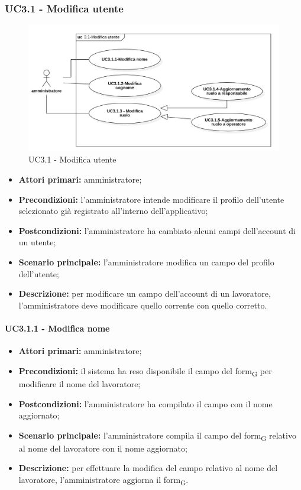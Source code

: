 \subsubsection{UC3.1 - Modifica utente}

\begin{figure}[H]
	\centering
	\includegraphics[scale=0.52]{res/images/uc3-1.png}
	\caption{UC3.1 - Modifica utente}
\end{figure}
\begin{itemize}
	\item 	\textbf{Attori primari:} amministratore;
	\item 	\textbf{Precondizioni:} l'amministratore intende modificare il profilo dell'utente selezionato già registrato all'interno dell'applicativo;
	\item 	\textbf{Postcondizioni:} l'amministratore ha cambiato alcuni campi dell'account di un utente;
	\item 	\textbf{Scenario principale:} l'amministratore modifica un campo del profilo dell'utente;
	\item 	\textbf{Descrizione:} per modificare un campo dell'account di un lavoratore, l'amministratore deve modificare quello corrente con quello corretto.

\end{itemize}

\paragraph{UC3.1.1 - Modifica nome}

\begin{itemize}
	\item 	\textbf{Attori primari:} amministratore;
	\item 	\textbf{Precondizioni:} il sistema ha reso disponibile il campo del form\textsubscript{G} per modificare il nome del lavoratore;
	\item 	\textbf{Postcondizioni:}  l'amministratore ha compilato il campo con il nome aggiornato;
	\item 	\textbf{Scenario principale:} l'amministratore compila il campo del form\textsubscript{G} relativo al nome del lavoratore con il nome aggiornato;
	\item 	\textbf{Descrizione:} per effettuare la modifica del campo relativo al nome del lavoratore, l'amministratore aggiorna il form\textsubscript{G}.
\end{itemize}

